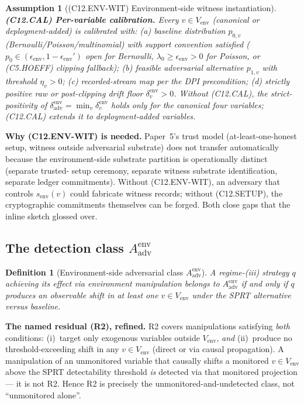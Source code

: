 \documentclass{article}
\newtheorem{definition}{Definition}
\newtheorem{assumption}{Assumption}
\newcommand{\Aadv}{A_{\mathrm{adv}}}
\newcommand{\deltaadv}{\delta_{\mathrm{adv}}}
\newcommand{\Vem}{V_{\mathrm{env}}}
\newcommand{\eenv}{\epsilon_{\mathrm{env}}}
\begin{document}
\begin{assumption}[(C12.ENV-WIT) Environment-side witness instantiation]
\textbf{(C12.CAL) Per-variable calibration.}  Every $v \in \Vem$
(canonical or deployment-added) is calibrated with: (a) baseline
distribution $p_{0, v}$ (Bernoulli/Poisson/multinomial) with
support convention satisfied ($p_0 \in (\eenv, 1 - \eenv')$ open
for Bernoulli, $\lambda_0 \geq \eenv > 0$ for Poisson, or
(C5.HOEFF) clipping fallback); (b) feasible adversarial alternative
$p_{1, v}$ with threshold $\eta_v > 0$; (c) recorded-stream map per
the DPI precondition; (d) strictly positive raw or post-clipping
drift floor $\delta_v^{\mathrm{env}} > 0$.  Without (C12.CAL),
the strict-positivity of $\deltaadv^{\mathrm{env}} = \min_v
\delta_v^{\mathrm{env}}$ holds only for the canonical four
variables; (C12.CAL) extends it to deployment-added variables.
\end{assumption}

\textbf{Why (C12.ENV-WIT) is needed.}  Paper~5's trust model
(at-least-one-honest setup, witness outside adversarial substrate)
does not transfer automatically because the environment-side
substrate partition is operationally distinct (separate trusted-
setup ceremony, separate witness substrate identification, separate
ledger commitments).  Without (C12.ENV-WIT), an adversary that
controls $s_{\mathrm{env}}(v)$ could fabricate witness records;
without (C12.SETUP), the cryptographic commitments themselves can
be forged.  Both close gaps that the inline sketch glossed over.

\subsection{The detection class $\Aadv^{\mathrm{env}}$}

\begin{definition}[Environment-side adversarial class
$\Aadv^{\mathrm{env}}$]
A regime-(iii) strategy $q$ achieving its effect via environment
manipulation belongs to $\Aadv^{\mathrm{env}}$ if and only if $q$
produces an observable shift in at least one $v \in V_{\mathrm{env}}$
under the SPRT alternative versus baseline.
\end{definition}

\textbf{The named residual (R2), refined.}  R2 covers
manipulations satisfying \emph{both} conditions:
(i)~target only exogenous variables outside $\Vem$, \emph{and}
(ii)~produce no threshold-exceeding shift in any $v \in \Vem$
(direct or via causal propagation).
A manipulation of an unmonitored variable that causally shifts a
monitored $v \in \Vem$ above the SPRT detectability threshold
\emph{is} detected via that monitored projection — it is not R2.
Hence R2 is precisely the unmonitored-and-undetected class, not
``unmonitored alone''.
\end{document}
